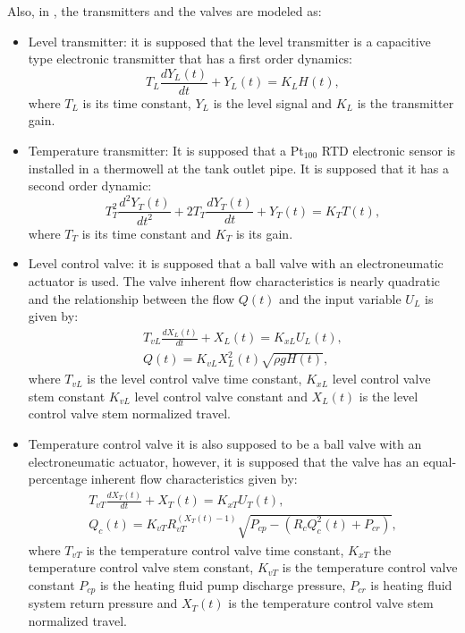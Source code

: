 Also, in \cite{Alfaro2016}, the transmitters and the valves are modeled as:
\begin{itemize}
	\item Level transmitter: it is supposed that the level transmitter is a capacitive type electronic transmitter that has a first order dynamics:
		\begin{equation*}
			T_L \frac{d Y_L(t)}{dt} + Y_L(t) = K_L H(t),
		\end{equation*}
		where $T_L$ is its time constant, $Y_L$ is the level signal and $K_L$ is the transmitter gain.
	\item Temperature transmitter: It is supposed that a Pt$_{100}$ RTD electronic sensor is installed in a thermowell at the tank outlet pipe. It is supposed that it has a second order dynamic:
		\begin{equation*}
			T_{T}^2 \frac{d^2 Y_T(t)}{dt^2} + 2T_T \frac{d Y_T(t)}{dt} + Y_T(t) = K_T T(t),
		\end{equation*}
		where $T_T$ is its time constant and $K_T$ is its gain.
	\item Level control valve: it is supposed that a ball valve with an electroneumatic actuator is used. The valve	inherent flow characteristics is nearly quadratic and the relationship between the flow $Q(t)$ and the input variable $U_L$ is given by:
		\begin{align*}
			T_{vL} \frac{d X_L(t)}{dt} + X_L(t) = K_{xL} U_L(t),\\
			Q(t) = K_{vL} X_L^2(t)\sqrt{\rho g H(t)},
		\end{align*}
		where $T_{vL}$ is the level control valve time constant, $K_{xL}$ level control valve stem constant $K_{vL}$ level control valve constant and $X_L(t)$ is the level control valve stem normalized travel.
	\item Temperature control valve it is also supposed to be a ball valve with an electroneumatic actuator, however, it is supposed that the valve has an equal-percentage inherent flow characteristics given by:
		\begin{align*}
			T_{vT} \frac{d X_T(t)}{dt} + X_T(t) = K_{xT} U_T(t),\\
			Q_c(t) = K_{vT}R_{vT}^{\left( X_T(t) -1 \right) } \sqrt{P_{cp} - \left(R_c Q^2_c(t)+P_{cr} \right) },
		\end{align*}
		where $T_{vT}$ is the temperature control valve time constant, $K_{xT}$ the temperature control valve stem constant, $K_{vT}$ is the temperature control valve constant $P_{cp}$ is the heating fluid pump discharge pressure, $P_{cr}$ is heating fluid system return pressure and $X_T(t)$ is the temperature control valve stem normalized travel.
\end{itemize}


